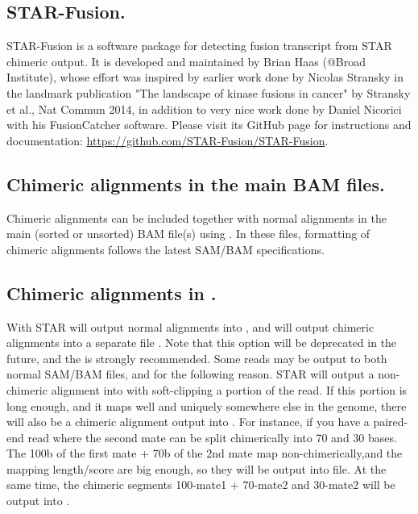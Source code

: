 \documentclass[12pt]{article}
\begin{document}
\subsection{STAR-Fusion.}
STAR-Fusion is a software package for detecting fusion transcript from STAR chimeric output. It is developed and maintained by Brian Haas (@Broad Institute), whose effort was  inspired by earlier work done by Nicolas Stransky in the landmark publication "The landscape of kinase fusions in cancer" by Stransky et al., Nat Commun 2014, in addition to very nice work done by Daniel Nicorici with his FusionCatcher software. Please visit its GitHub page for instructions and documentation: \url{https://github.com/STAR-Fusion/STAR-Fusion}.

\subsection{Chimeric alignments in the main BAM files.}
Chimeric alignments can be included together with normal alignments in the main (sorted or unsorted) BAM file(s) using  . In these files, formatting of chimeric alignments follows the latest SAM/BAM specifications.

\subsection{Chimeric alignments in  .}
With   STAR will output normal alignments into , and will output chimeric alignments into a separate file . Note that this option will be deprecated in the future, and the   is strongly recommended.
Some reads may be output to both normal SAM/BAM files, and  for the following reason. STAR will output a non-chimeric alignment into  with soft-clipping a portion of the read. If this portion is long enough, and it maps well and uniquely  somewhere else in the genome, there will also be a chimeric alignment output into . For instance, if you have a paired-end read where the second mate can be split chimerically into 70 and 30 bases. The 100b of the first mate + 70b of the 2nd mate map non-chimerically,and the mapping length/score are big enough, so they will be output into  file. At the same time, the chimeric segments 100-mate1 + 70-mate2 and 30-mate2 will be output into .
\end{document}
